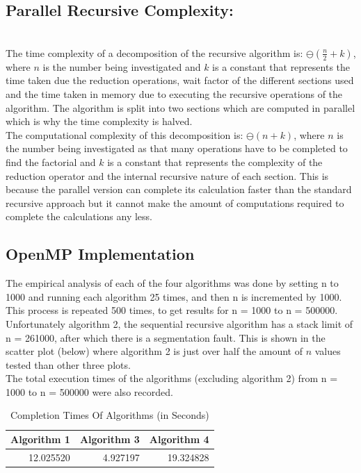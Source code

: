\documentclass[11pt]{article}
\begin{document}
\begin{page}
\noindent \chapter{Parallel Recursive Complexity:} \\
The time complexity of a decomposition of the recursive algorithm is: $\ominus(\frac{n}{2} + k)$, where $n$ is the number being investigated and $k$ is a constant that represents the time taken due the reduction operations, wait factor of the different sections used and the time taken in memory due to executing the recursive operations of the algorithm. The algorithm is split into two sections which are computed in parallel which is why the time complexity is halved.\\

\noindent The computational complexity of this decomposition is: $\ominus(n + k)$, where $n$ is the number being investigated as that many operations have to be completed to find the factorial and $k$ is a constant that represents the complexity of the reduction operator and the internal recursive nature of each section. This is because the parallel version can complete its calculation faster than the standard recursive approach but it cannot make the amount of computations required to complete the calculations any less.\\ 

\break

\section{OpenMP Implementation}
\noindent The empirical analysis of each of the four algorithms was done by setting n to 1000 and running each algorithm 25 times, and then n is incremented by 1000. This process is repeated 500 times, to get results for n = 1000 to n = 500000.\\

\noindent Unfortunately algorithm 2, the sequential recursive algorithm has a stack limit of n = 261000, after which there is a segmentation fault. This is shown in the scatter plot (below) where algorithm 2 is just over half the amount of $n$ values tested than other three plots.\\

\noindent The total execution times of the algorithms (excluding algorithm 2) from n = 1000 to n = 500000 were also recorded.

\begin{table}[ht]
\centering
\begin{tabular}{|c|c|c|}
\hline
Algorithm 1 & Algorithm 3 & Algorithm 4 \\ \hline
\multicolumn{1}{|r|}{12.025520} & \multicolumn{1}{r|}{4.927197} & \multicolumn{1}{r|}{19.324828} \\ \hline
\end{tabular}
\caption{Completion Times Of Algorithms (in Seconds)}
\end{table}


\end{page}
\end{document}
